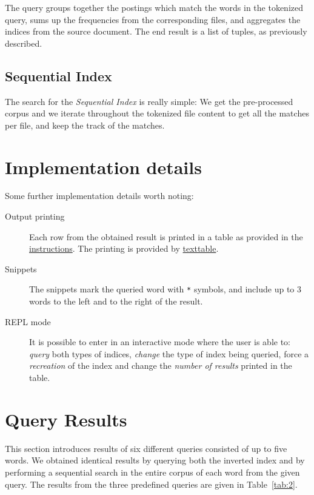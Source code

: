 \documentclass{article}
\begin{document}
	The query groups together the postings which match the words in the tokenized query, sums up the frequencies from the corresponding files, and aggregates the indices from the source document. The end result is a list of tuples, as previously described.
	
	\subsection{Sequential Index}
	The search for the \textit{Sequential Index} is really simple: We get the pre-processed corpus and we iterate throughout the tokenized file content to get all the matches per file, and keep the track of the matches.
	
	\section{Implementation details}
	Some further implementation details worth noting:
	\begin{description}
		\item[Output printing] Each row from the obtained result is printed in a table as provided in the \href{http://zitnik.si/teaching/wier/PA3.html}{instructions}. The printing is provided by \href{https://pypi.org/project/texttable/}{texttable}.
		
		\item[Snippets] The snippets mark the queried word with \texttt{*} symbols, and include up to 3 words to the left and to the right of the result.
		
		\item[REPL mode] It is possible to enter in an interactive mode where the user is able to: \textit{query} both types of indices, \textit{change} the type of index being queried, force a \textit{recreation} of the index and change the \textit{number of results} printed in the table.
	\end{description}
	
	\section{Query Results}
	This section introduces results of six different queries consisted of up to five words. We obtained identical results by querying both the inverted index and by performing a sequential search in the entire corpus of each word from the given query. The results from the three predefined queries are given in Table~\ref{tab:2}.
	
\end{document}

